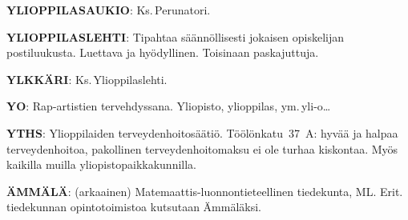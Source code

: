 \documentclass[../ala_hataile.tex]{subfiles}
\begin{document}
\textbf{YLIOPPILASAUKIO}: Ks.\,Perunatori.

\textbf{YLIOPPILASLEHTI}: Tipahtaa säännöllisesti
jokaisen opiskelijan postiluukusta.
Luettava ja hyödyllinen. Toisinaan paskajuttuja.

\textbf{YLKKÄRI}: Ks.\,Ylioppilaslehti.

\textbf{YO}: Rap-artistien tervehdyssana. Yliopisto,
ylioppilas, ym.\,yli-o\dots

\textbf{YTHS}: Ylioppilaiden terveydenhoitosäätiö.
Töölönkatu~37~A: hyvää ja halpaa
terveydenhoitoa, pakollinen terveydenhoitomaksu
ei ole turhaa kiskontaa. Myös kaikilla
muilla yliopistopaikkakunnilla.

\textbf{ÄMMÄLÄ}: (arkaainen) Matemaattis-luonnon\-tieteellinen
tiedekunta, ML. Erit.\,tiedekunnan opinto\-toimistoa kutsutaan
Ämmäläksi.
\end{document}
